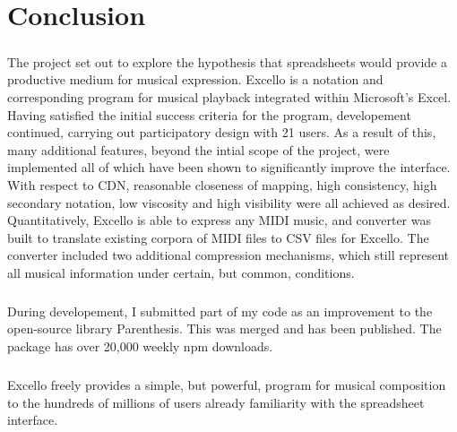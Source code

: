 \chapter{Conclusion}

\paragraph{} The project set out to explore the hypothesis that spreadsheets would provide a productive medium for musical expression. Excello is a notation and corresponding program for musical playback integrated within Microsoft's Excel. Having satisfied the initial success criteria for the program, developement continued, carrying out participatory design with 21 users. As a result of this, many additional features, beyond the intial scope of the project, were implemented all of which have been shown to significantly improve the interface. With respect to CDN, reasonable closeness of mapping, high consistency, high secondary notation, low viscosity and high visibility were all achieved as desired. Quantitatively, Excello is able to express any  MIDI music, and converter was built to translate existing corpora of MIDI files to CSV files for Excello. The converter included two additional compression mechanisms, which still represent all musical information under certain, but common, conditions.

\paragraph{} During developement, I submitted part of my code as an improvement to the open-source library Parenthesis. This was merged and has been published. The package has over 20,000 weekly npm downloads.

\paragraph{} Excello freely provides a simple, but powerful, program for musical composition to the hundreds of millions of users already familiarity with the spreadsheet interface.
